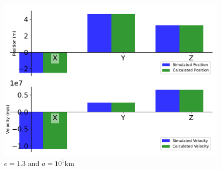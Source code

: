 \begin{figure}[htbp]\centerline{\includegraphics[height=0.7\textwidth, keepaspectratio]{AutoTeX/IncHyp_a_1}}\caption{$e = 1.3$ and $a = 10^1$km}\label{fig:IncHyp_a_1}\end{figure}